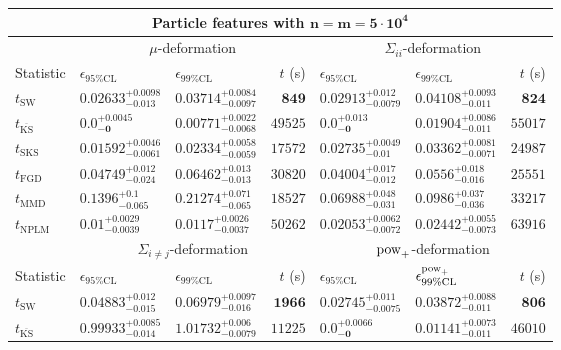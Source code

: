 \begin{tabular}{l|llr|llr}
	\toprule
	\multicolumn{7}{c}{{\bf Particle features with $\mathbf{n=m=5\cdot 10^{4}}$}} \\
	\toprule
	\multicolumn{1}{c}{} & \multicolumn{3}{c}{$\mu$-deformation} & \multicolumn{3}{c}{$\Sigma_{ii}$-deformation} \\
	Statistic & $\epsilon_{95\%\mathrm{CL}}$ & $\epsilon_{99\%\mathrm    {CL}}$ & $t$ (s) & $\epsilon_{95\%\mathrm{CL}}$ & $\epsilon_{99\%\mathrm{CL}}$ & $t$ (s) \\
	\midrule
	$t_{\mathrm{SW}}$ & $0.02633_{-0.013}^{+0.0098}$ & $0.03714_{-0.0097}^{+0.0084}$ & ${\mathbf{849}}$ & $0.02913_{-0.0079}^{+0.012}$ & $0.04108_{-0.011}^{+0.0093}$ & ${\mathbf{824}}$ \\
	$t_{\overline{\mathrm{KS}}}$ & ${\mathbf{0.0_{-0}^{+0.0045}}}$ & ${\mathbf{0.00771_{-0.0068}^{+0.0022}}}$ & $49525$ & ${\mathbf{0.0_{-0}^{+0.013}}}$ & ${\mathbf{0.01904_{-0.011}^{+0.0086}}}$ & $55017$ \\
	$t_{\mathrm{SKS}}$ & $0.01592_{-0.0061}^{+0.0046}$ & $0.02334_{-0.0059}^{+0.0058}$ & $17572$ & $0.02735_{-0.01}^{+0.0049}$ & $0.03362_{-0.0071}^{+0.0081}$ & $24987$ \\
	$t_{\mathrm{FGD}}$ & $0.04749_{-0.024}^{+0.012}$ & $0.06462_{-0.013}^{+0.013}$ & $30820$ & $0.04004_{-0.012}^{+0.017}$ & $0.0556_{-0.016}^{+0.018}$ & $25551$ \\
	$t_{\mathrm{MMD}}$ & $0.1396_{-0.065}^{+0.1}$ & $0.21274_{-0.065}^{+0.071}$ & $18527$ & $0.06988_{-0.031}^{+0.048}$ & $0.0986_{-0.036}^{+0.037}$ & $33217$ \\
\rowcolor{red!35}	$t_{\mathrm{NPLM}}$ & $0.01_{-0.0039}^{+0.0029}$ & $0.0117_{-0.0037}^{+0.0026}$ & $50262$ & $0.02053_{-0.0072}^{+0.0062}$ & $0.02442_{-0.0073}^{+0.0055}$ & $63916$ \\
	\toprule
	\multicolumn{1}{c}{} & \multicolumn{3}{c}{$\Sigma_{i\neq j}$-deformation} & \multicolumn{3}{c}{$\rm{pow}_{+}$-deformation} \\
	Statistic & $\epsilon_{95\%\mathrm{CL}}$ & $\epsilon_{99\%\mathrm{CL}}$ & $t$ (s) & $\epsilon_{95\%\mathrm{CL}}$ & $\epsilon^{\rm   {pow}_{+}}_{99\%\mathrm{CL}}$ & $t$ (s) \\
	\midrule
	$t_{\mathrm{SW}}$ & $0.04883_{-0.015}^{+0.012}$ & $0.06979_{-0.016}^{+0.0097}$ & ${\mathbf{1966}}$ & $0.02745_{-0.0075}^{+0.011}$ & $0.03872_{-0.011}^{+0.0088}$ & ${\mathbf{806}}$ \\
	$t_{\overline{\mathrm{KS}}}$ & $0.99933_{-0.014}^{+0.0085}$ & $1.01732_{-0.0079}^{+0.006}$ & $11225$ & ${\mathbf{0.0_{-0}^{+0.0066}}}$ & ${\mathbf{0.01141_{-0.011}^{+0.0073}}}$ & $46010$ \\

\end{tabular}
